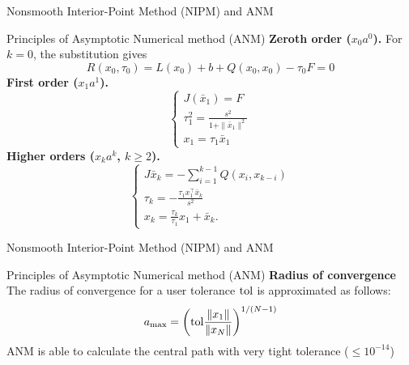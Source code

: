 \begin{frame}{Nonsmooth Interior-Point Method (NIPM) and ANM}
 \begin{block}{Principles of Asymptotic Numerical method (ANM)}
  \textbf{Zeroth order ($x_0 a^0$).}   For $k=0$, the substitution  gives
\begin{equation}
  \label{eq:4}
  R(x_0,\tau_0) = L(x_0) + b + Q(x_0,x_0) -\tau_0 F  =0
\end{equation}
\textbf{First order ($x_1 a^1$).}
\begin{equation}
  \label{eq:6}
  \begin{cases}
  J(\bar x_1) =  F \\
  \tau^2_1 = \frac{s^2}{1+\|\bar x_1\|^2}\\
    x_1 = \tau_1 \bar x_1
  \end{cases}
\end{equation}
\textbf{Higher orders ($x_k a^k$, $k \geq 2$).}  
\begin{equation}
  \label{eq:15}
  \left\{
    \begin{array}{l}
      J \bar x_k =- \sum_{i=1}^{k-1}   Q(x_i,x_{k-i})\\[2mm]
      \tau_k = - \frac{\tau_1 x_1^\top \bar x_k}{s^2}\\[2mm]
      x_k  = \frac{\tau_k}{\tau_1} x_1+ \bar x_k.
  \end{array}\right.
\end{equation}




 \end{block}
\end{frame}
\begin{frame}{Nonsmooth Interior-Point Method (NIPM) and ANM}
 \begin{block}{Principles of Asymptotic Numerical method (ANM)}
\textbf{Radius of convergence}
The radius of convergence for a user tolerance $\rm tol$ is approximated as follows:
\begin{equation}
  \label{eq:16}
  a_{\max} = \left({\rm tol}\frac{\|x_1\|}{\|x_N\|} \right)^{1/(N-1)}
\end{equation}
ANM is able to calculate the central path with very tight tolerance ($\leq 10^{-14}$)
\end{block}
\end{frame}

